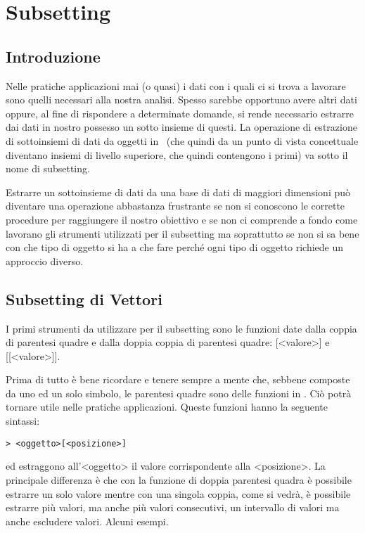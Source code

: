 \chapter{Subsetting}
\section{Introduzione}

Nelle pratiche applicazioni mai (o quasi) i dati con i quali ci si trova a lavorare sono quelli necessari alla nostra analisi. Spesso sarebbe opportuno avere altri dati oppure, al fine di rispondere a determinate domande, si rende necessario estrarre dai dati in nostro possesso un sotto insieme di questi. La operazione di estrazione di sottoinsiemi di dati da oggetti in \erre\ (che quindi da un punto di vista concettuale diventano insiemi di livello superiore, che quindi contengono i primi) va sotto il nome di subsetting.

Estrarre un sottoinsieme di dati da una base di dati di maggiori dimensioni può diventare una operazione abbastanza frustrante se non si conoscono le corrette procedure per raggiungere il nostro obiettivo e se non ci comprende a fondo come lavorano gli strumenti utilizzati per il subsetting ma soprattutto se non si sa bene con che tipo di oggetto si ha a che fare perché ogni tipo di oggetto richiede un approccio diverso.

\section{Subsetting di Vettori}
I primi strumenti da utilizzare per il subsetting sono le funzioni date dalla coppia di parentesi quadre e dalla doppia coppia di parentesi quadre: [<valore>] e [[<valore>]].

Prima di tutto è bene ricordare e tenere sempre a mente che, sebbene composte da uno ed un solo simbolo, le parentesi quadre sono delle funzioni in \erre. Ciò potrà tornare utile nelle pratiche applicazioni. Queste funzioni hanno la seguente sintassi:
\begin{lstlisting}
> <oggetto>[<posizione>]
\end{lstlisting}
ed estraggono all'<oggetto> il valore corrispondente alla <posizione>. La principale differenza è che con la funzione di doppia parentesi quadra è possibile estrarre un solo valore mentre con una singola coppia, come si vedrà, è possibile estrarre più valori, ma anche più valori consecutivi, un intervallo di valori ma anche escludere valori. Alcuni esempi.

